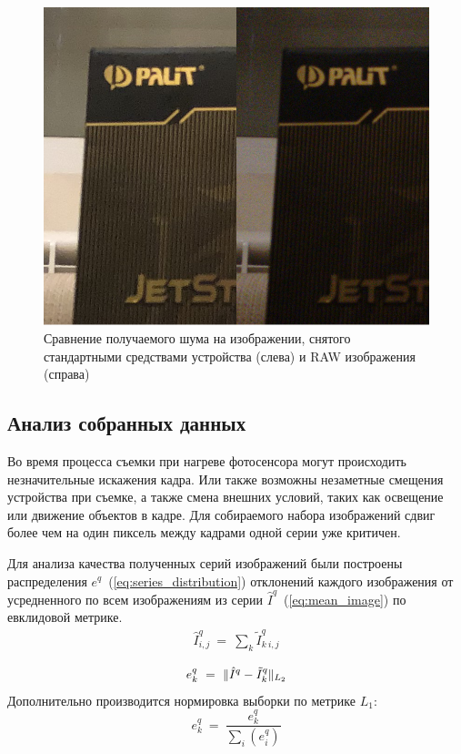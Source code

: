 \begin{figure}[h]
	\centering
	\includegraphics[width=\textwidth]{img/noise_comprasion}
	\caption{Сравнение получаемого шума на изображении, снятого стандартными средствами устройства (слева) и RAW изображения (справа)}
	\label{fig:noise_comprasion}
\end{figure}


\subsection{Анализ собранных данных}

Во время процесса съемки при нагреве фотосенсора могут происходить незначительные искажения кадра. Или также возможны незаметные смещения устройства при съемке, а также смена внешних условий, таких как освещение или движение объектов в кадре. Для собираемого набора изображений сдвиг более чем на один пиксель между кадрами одной серии уже критичен.

Для анализа качества полученных серий изображений были построены распределения $e^q$~(\ref{eq:series_distribution}) отклонений каждого изображения от усредненного по всем изображениям из серии $\hat{I}^q$~(\ref{eq:mean_image}) по евклидовой метрике.
\begin{eqnarray}\label{eq:mean_image}
\hat{I}^q_{i,j}\ =\ \sum_{k}\tilde{I}^q_{k\ i,j}
\end{eqnarray}

\begin{eqnarray}\label{eq:series_distribution}
e^q_k\ =\ \Arrowvert \hat{I}^q - \tilde{I}^q_k \Arrowvert_{L_2}
\end{eqnarray}
Дополнительно производится нормировка выборки по метрике $L_1$:
$$e^q_k\ =\ \frac{e^q_k}{\sum_{i}(e^q_i)}$$

